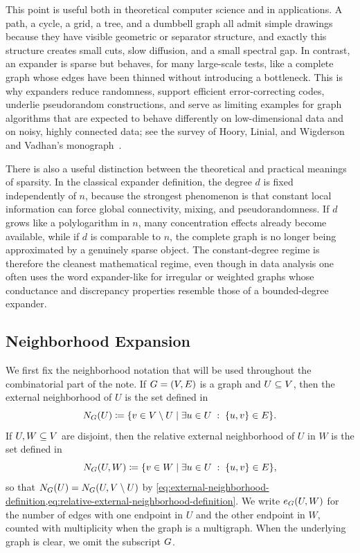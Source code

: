 This point is useful both in theoretical computer science and in applications. A path, a cycle, a grid, a tree, and a dumbbell graph all admit simple drawings because they have visible geometric or separator structure, and exactly this structure creates small cuts, slow diffusion, and a small spectral gap. In contrast, an expander is sparse but behaves, for many large-scale tests, like a complete graph whose edges have been thinned without introducing a bottleneck. This is why expanders reduce randomness, support efficient error-correcting codes, underlie pseudorandom constructions, and serve as limiting examples for graph algorithms that are expected to behave differently on low-dimensional data and on noisy, highly connected data; see the survey of Hoory, Linial, and Wigderson~\cite{HLW2006} and Vadhan's monograph~\cite{Vad2012}.

There is also a useful distinction between the theoretical and practical meanings of sparsity. In the classical expander definition, the degree \(d\) is fixed independently of \(n\), because the strongest phenomenon is that constant local information can force global connectivity, mixing, and pseudorandomness. If \(d\) grows like a polylogarithm in \(n\), many concentration effects already become available, while if \(d\) is comparable to \(n\), the complete graph is no longer being approximated by a genuinely sparse object. The constant-degree regime is therefore the cleanest mathematical regime, even though in data analysis one often uses the word expander-like for irregular or weighted graphs whose conductance and discrepancy properties resemble those of a bounded-degree expander.

\subsection{Neighborhood Expansion}
\label{subsec:neighborhood-expansion}

We first fix the neighborhood notation that will be used throughout the combinatorial part of the note. If \(G=(V,E)\) is a graph and \(U\subseteq V\), then the external neighborhood of \(U\) is the set defined in
\begin{equation}
	\label{eq:external-neighborhood-definition}
	N_{G}(U)\coloneqq \{v\in V\setminus U\mid \exists u\in U \;:\; \{u,v\}\in E\}.
\end{equation}
If \(U,W\subseteq V\) are disjoint, then the relative external neighborhood of \(U\) in \(W\) is the set defined in
\begin{equation}
	\label{eq:relative-external-neighborhood-definition}
	N_{G}(U,W)\coloneqq \{v\in W\mid \exists u\in U \;:\; \{u,v\}\in E\},
\end{equation}
so that \(N_{G}(U)=N_{G}(U,V\setminus U)\) by \cref{eq:external-neighborhood-definition,eq:relative-external-neighborhood-definition}. We write \(e_{G}(U,W)\) for the number of edges with one endpoint in \(U\) and the other endpoint in \(W\), counted with multiplicity when the graph is a multigraph. When the underlying graph is clear, we omit the subscript \(G\).

